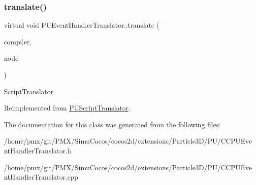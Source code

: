\subsubsection{\texorpdfstring{translate()}{translate()}\hspace{0.1cm}{\footnotesize\ttfamily [2/2]}}
{\footnotesize\ttfamily virtual void P\+U\+Event\+Handler\+Translator\+::translate (\begin{DoxyParamCaption}\item[{\hyperlink{classPUScriptCompiler}{P\+U\+Script\+Compiler} $\ast$}]{compiler,  }\item[{\hyperlink{classPUAbstractNode}{P\+U\+Abstract\+Node} $\ast$}]{node }\end{DoxyParamCaption})\hspace{0.3cm}{\ttfamily [virtual]}}

Script\+Translator 

Reimplemented from \hyperlink{classPUScriptTranslator_a9ff2cdfda9ea8db6fd716e7b69dbe79b}{P\+U\+Script\+Translator}.



The documentation for this class was generated from the following files\+:\begin{DoxyCompactItemize}
\item 
/home/pmx/git/\+P\+M\+X/\+Simu\+Cocos/cocos2d/extensions/\+Particle3\+D/\+P\+U/C\+C\+P\+U\+Event\+Handler\+Translator.\+h\item 
/home/pmx/git/\+P\+M\+X/\+Simu\+Cocos/cocos2d/extensions/\+Particle3\+D/\+P\+U/C\+C\+P\+U\+Event\+Handler\+Translator.\+cpp\end{DoxyCompactItemize}
